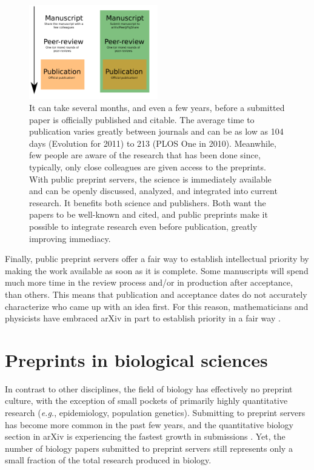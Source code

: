 \documentclass[letterpaper,twocolumn,superscriptaddress,showkeys,longbibliography]{revtex4-1}
\begin{document}
\begin{figure}[ht!] \centering\includegraphics[width=0.50\textwidth]{map.pdf}
\caption { It can take several months, and even a few years, before a submitted
paper is officially published and citable.  The average time to publication
varies greatly between journals and can be as low as 104 days (Evolution for
2011) to 213 (PLOS One in 2010).  Meanwhile, few people are aware of the
research that has been done since, typically, only close colleagues are given
access to the preprints. With public preprint servers, the science is
immediately available and can be openly discussed, analyzed, and integrated into
current research. It benefits both science and publishers. Both want the papers
to be well-known and cited, and public preprints make it possible to integrate
research even before publication, greatly improving immediacy.  }
\label{fig:map} \end{figure}

Finally, public preprint servers offer a fair way to establish intellectual
priority by making the work available as soon as it is complete. Some
manuscripts will spend much more time in the review process and/or in
production after acceptance, than others. This means that publication and
acceptance dates do not accurately characterize who came up with an idea
first. For this reason, mathematicians and physicists have embraced arXiv in
part to establish priority in a fair way \cite{gin11,cal12}.

\section{Preprints in biological sciences}

In contrast to other disciplines, the field of biology has effectively no
preprint culture, with the exception of small pockets of primarily highly
quantitative research (\emph{e.g.}, epidemiology, population genetics).
Submitting to preprint servers has become more common in the past few years,
and the quantitative biology section in arXiv is experiencing the fastest
growth in submissions \cite{cal12}. Yet, the number of biology papers
submitted to preprint servers still represents only a small fraction of the
total research produced in biology.
\end{document}
